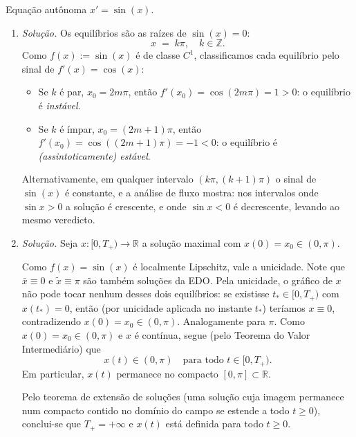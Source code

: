 \documentclass[10pt,a4paper]{amsart}
\newcommand{\R}{\mathbb{R}}
\begin{document}
\vspace{5mm}

 Equação autônoma $x' = \sin(x)$.
\begin{enumerate}[label=(\alph*)]
    \item \emph{Solução.} Os equilíbrios são as raízes de $\sin(x) = 0$:
    \[
        x \;=\; k \pi, \quad k \in \mathbb{Z}.
    \]
    Como $f(x) := \sin(x)$ é de classe $C^1$, classificamos cada equilíbrio pelo sinal de $f'(x) = \cos(x)$:
    \begin{itemize}
        \item Se $k$ é par, $x_0 = 2 m \pi$, então $f'(x_0) = \cos(2 m \pi) = 1 > 0$: o equilíbrio é \emph{instável}.
        \item Se $k$ é ímpar, $x_0 = (2 m + 1) \pi$, então $f'(x_0) = \cos((2 m + 1) \pi) = -1 < 0$: o equilíbrio é \emph{(assintoticamente) estável}.
    \end{itemize}
    Alternativamente, em qualquer intervalo $(k\pi, (k+1)\pi)$ o sinal de $\sin(x)$ é constante, e a análise de fluxo mostra: nos intervalos onde $\sin x > 0$ a solução é crescente, e onde $\sin x < 0$ é decrescente, levando ao mesmo veredicto.

    \item \emph{Solução.} Seja $x : [0, T_+) \to \R$ a solução maximal com $x(0) = x_0 \in (0, \pi)$.

    Como $f(x) = \sin(x)$ é localmente Lipschitz, vale a unicidade. Note que $\bar x \equiv 0$ e $\tilde x \equiv \pi$ são também soluções da EDO. Pela unicidade, o gráfico de $x$ não pode tocar nenhum desses dois equilíbrios: se existisse $t_* \in [0, T_+)$ com $x(t_*) = 0$, então (por unicidade aplicada no instante $t_*$) teríamos $x \equiv 0$, contradizendo $x(0) = x_0 \in (0, \pi)$. Analogamente para $\pi$. Como $x(0) = x_0 \in (0, \pi)$ e $x$ é contínua, segue (pelo Teorema do Valor Intermediário) que
    \[
        x(t) \in (0, \pi) \quad \text{para todo } t \in [0, T_+).
    \]
    Em particular, $x(t)$ permanece no compacto $[0, \pi] \subset \R$.

    Pelo teorema de extensão de soluções (uma solução cuja imagem permanece num compacto contido no domínio do campo se estende a todo $t \geq 0$), conclui-se que $T_+ = +\infty$ e $x(t)$ está definida para todo $t \geq 0$.
\end{enumerate}

\vspace{5mm}
\end{document}
